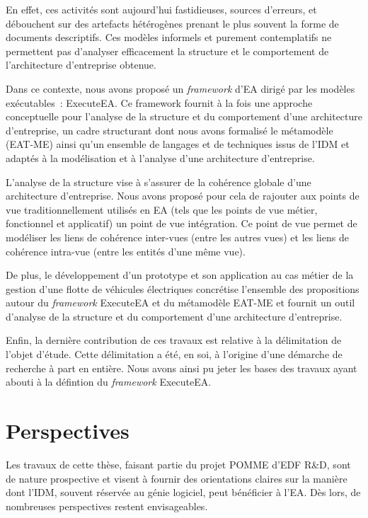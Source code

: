 En effet, ces activités sont aujourd'hui fastidieuses, sources d'erreurs,
et débouchent sur des artefacts hétérogènes prenant le plus souvent la forme
de documents descriptifs. Ces modèles informels et purement contemplatifs
ne permettent pas d'analyser efficacement 
la structure et le comportement de l'architecture d'entreprise obtenue.

Dans ce contexte, nous avons proposé un \emph{framework}
d'EA dirigé par les modèles exécutables~: ExecuteEA. Ce framework fournit à la fois une approche
conceptuelle pour l'analyse de la structure et du comportement d'une architecture d'entreprise, un cadre structurant dont nous
avons formalisé le métamodèle (EAT-ME) ainsi qu'un ensemble de langages et de techniques issus de l'IDM et adaptés à la modélisation
et à l'analyse d'une architecture d'entreprise. 

L'analyse de la structure vise à s'assurer de la cohérence globale d'une architecture d'entreprise. Nous avons
proposé pour cela de rajouter aux points de vue traditionnellement utilisés en EA (tels que les points de vue métier, fonctionnel et
applicatif) un point de vue intégration. Ce point de vue permet de modéliser les liens de cohérence inter-vues (entre les autres vues)
et les liens de cohérence intra-vue (entre les entités d'une même vue).

De plus, le développement d'un prototype et son application au cas métier
de la gestion d'une flotte de véhicules électriques concrétise l'ensemble des
propositions autour du \emph{framework} ExecuteEA et du métamodèle EAT-ME
et fournit un outil d'analyse de la structure et du comportement
d'une architecture d'entreprise.

Enfin, la dernière contribution de ces travaux est relative à la délimitation de l'objet d'étude.
Cette délimitation a été, en soi, à l'origine d'une démarche de recherche à part en entière.
Nous avons ainsi pu jeter les bases des travaux ayant abouti à la défintion du \emph{framework} ExecuteEA.

\section{Perspectives}

Les travaux de cette thèse, faisant partie du projet POMME d'EDF R\&D, sont de nature prospective et visent à fournir 
des orientations claires sur la manière dont l'IDM, souvent réservée au génie logiciel, peut bénéficier à l'EA.
Dès lors, de nombreuses perspectives restent envisageables.

